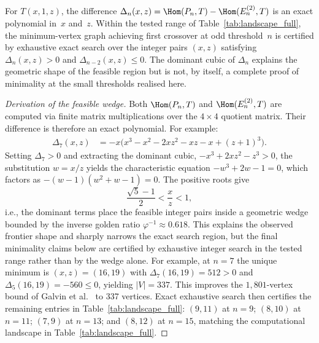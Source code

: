 \begin{compresult}
\label{thm:frontier}
For $T(x,1,z)$, the difference $\Delta_n(x,z) = \Hom(P_n, T) -
\Hom(E_n^{(2)}, T)$ is an exact polynomial in~$x$ and~$z$.
Within the tested range of Table~\ref{tab:landscape_full}, the
minimum-vertex graph achieving first crossover at odd threshold~$n$
is certified by exhaustive exact search over the integer pairs
$(x,z)$ satisfying $\Delta_n(x,z) > 0$ and $\Delta_{n-2}(x,z) \le 0$.
The dominant cubic of $\Delta_n$ explains the geometric shape of the
feasible region but is not, by itself, a complete proof of minimality
at the small thresholds realised here.
\end{compresult}

\begin{proof}[Derivation of the feasible wedge]
Both $\Hom(P_n, T)$ and $\Hom(E_n^{(2)}, T)$ are computed via
finite matrix multiplications over the $4 \times 4$ quotient matrix.
Their difference is therefore an exact polynomial.  For example:
\begin{align*}
  \Delta_7(x,z) &= -x\bigl(x^3 - x^2 - 2xz^2 - xz - x + (z+1)^3\bigr).
\end{align*}
Setting $\Delta_7 > 0$ and extracting the dominant cubic,
$-x^3 + 2xz^2 - z^3 > 0$, the substitution $w = x/z$ yields the
characteristic equation $-w^3 + 2w - 1 = 0$, which factors as
$-(w-1)(w^2 + w - 1) = 0$.  The positive roots give
\[
  \frac{\sqrt{5} - 1}{2} < \frac{x}{z} < 1,
\]
i.e., the dominant terms place the feasible integer pairs inside a
geometric wedge bounded by the inverse golden ratio
$\varphi^{-1} \approx 0.618$. This explains the observed frontier
shape and sharply narrows the exact search region, but the final
minimality claims below are certified by exhaustive integer search in
the tested range rather than by the wedge alone. For example, at
$n = 7$ the
unique minimum is $(x,z) = (16,19)$ with $\Delta_7(16,19) = 512 > 0$
and $\Delta_5(16,19) = -560 \le 0$, yielding $|V| = 337$.  This
improves the $1{,}801$-vertex bound of
Galvin et al.~\cite{galvin2025} to 337 vertices. Exact exhaustive search then certifies the remaining entries in
Table~\ref{tab:landscape_full}: $(9,11)$ at $n = 9$; $(8,10)$ at
$n = 11$; $(7,9)$ at $n = 13$; and $(8,12)$ at $n = 15$, matching
the computational landscape in Table~\ref{tab:landscape_full}.
\end{proof}


